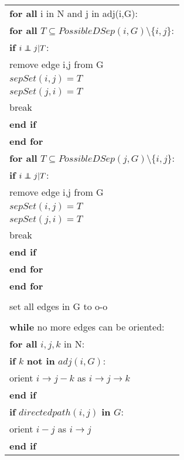 \documentclass{article}
\newcommand\independent{\protect\mathpalette{\protect\independenT}{\perp}}
\def\independenT#1#2{\mathrel{\rlap{$#1#2$}\mkern2mu{#1#2}}}
\begin{document}
\begin{table}[h!]
\begin{tabular}{|l l|}
		\multicolumn{2}{|l|}{\textbf{for all} i in N and j in adj(i,G):}\\
		\multicolumn{2}{|l|}{\quad \textbf{for all} $T \subseteq PossibleDSep(i,G)\setminus \{i,j\}$:}\\
		\multicolumn{2}{|l|}{\quad\quad \textbf{if} $i \independent j | T$:}\\
		\multicolumn{2}{|l|}{\quad\quad \quad remove edge i,j from G}\\
		\multicolumn{2}{|l|}{\quad\quad \quad $sepSet(i,j) = T$}\\	
		\multicolumn{2}{|l|}{\quad\quad \quad $sepSet(j,i) = T$}\\
		\multicolumn{2}{|l|}{\quad\quad \quad break}\\
		\multicolumn{2}{|l|}{\quad\quad\textbf{end if}}\\
		\multicolumn{2}{|l|}{\quad\textbf{end for}}\\
		\multicolumn{2}{|l|}{\quad \textbf{for all} $T \subseteq PossibleDSep(j,G)\setminus \{i,j\}$:}\\
		\multicolumn{2}{|l|}{\quad\quad \textbf{if} $i \independent j | T$:}\\
		\multicolumn{2}{|l|}{\quad\quad \quad remove edge i,j from G}\\
		\multicolumn{2}{|l|}{\quad\quad \quad $sepSet(i,j) = T$}\\	
		\multicolumn{2}{|l|}{\quad\quad \quad $sepSet(j,i) = T$}\\
		\multicolumn{2}{|l|}{\quad\quad \quad break}\\
		\multicolumn{2}{|l|}{\quad\quad\textbf{end if}}\\
		\multicolumn{2}{|l|}{\quad\textbf{end for}}\\
		\multicolumn{2}{|l|}{\textbf{end for}}\\	
		&\\
		\multicolumn{2}{|l|}{set all edges in G to o-o}\\
		&\\
		\multicolumn{2}{|l|}{\textbf{while} no more edges can be oriented:}\\
		\multicolumn{2}{|l|}{\quad\textbf{for all} $ i,j,k $ in N:}\\
		\multicolumn{2}{|l|}{\quad\quad\textbf{if} $ k $ \textbf{not in} $ adj(i,G) $:}\\
		\multicolumn{2}{|l|}{\quad\quad\quad orient $ i\rightarrow j-k $ as $ i\rightarrow j \rightarrow k $ }\\
		\multicolumn{2}{|l|}{\quad\quad\textbf{end if}}\\
		\multicolumn{2}{|l|}{\quad\quad\textbf{if} $ directedpath(i,j)$ \textbf{in} $G $:}\\
		\multicolumn{2}{|l|}{\quad\quad\quad orient $ i- j $ as $ i\rightarrow j $ }\\
		\multicolumn{2}{|l|}{\quad\quad\textbf{end if}}\\
		

\end{tabular}
\end{table}
\end{document}
